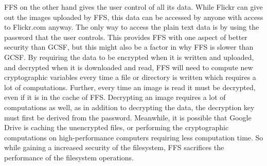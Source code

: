 \gls{FFS} on the other hand gives the user control of all its data. While Flickr can give out the images uploaded by \gls{FFS}, this data can be accessed by anyone with access to Flickr.com anyway. The only way to access the plain text data is by using the password that the user controls. This provides \gls{FFS} with one aspect of better security than \gls{GCSF}, but this might also be a factor in why \gls{FFS} is slower than \gls{GCSF}. By requiring the data to be encrypted when it is written and uploaded, and decrypted when it is downloaded and read, \gls{FFS} will need to compute new cryptographic variables every time a file or directory is written which requires a lot of computations. Further, every time an image is read it must be decrypted, even if it is in the cache of \gls{FFS}. Decrypting an image requires a lot of computations as well, as in addition to decrypting the data, the decryption key must first be derived from the password. Meanwhile, it is possible that Google Drive is caching the unencrypted files, or performing the cryptographic computations on \mbox{high-performance} computers requiring less computation time. So while gaining a increased security of the filesystem, \gls{FFS} sacrifices the performance of the filesystem operations.


